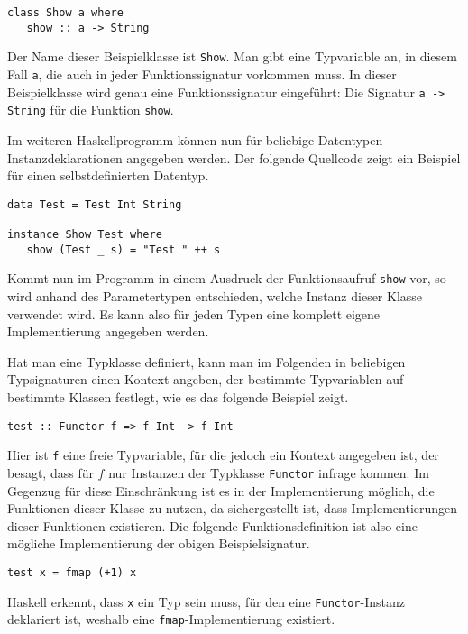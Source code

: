 \begin{verbatim}
class Show a where
   show :: a -> String
\end{verbatim}

Der Name dieser Beispielklasse ist \texttt{Show}. Man gibt eine Typvariable an, in diesem Fall \texttt{a}, die auch in jeder
Funktionssignatur vorkommen muss. In dieser Beispielklasse wird genau eine Funktionssignatur eingeführt: Die Signatur
\texttt{a -> String} für die Funktion \texttt{show}.

Im weiteren Haskellprogramm können nun für beliebige Datentypen Instanzdeklarationen angegeben werden. Der folgende
Quellcode zeigt ein Beispiel für einen selbstdefinierten Datentyp.

\begin{verbatim}
data Test = Test Int String

instance Show Test where
   show (Test _ s) = "Test " ++ s
\end{verbatim}

Kommt nun im Programm in einem Ausdruck der Funktionsaufruf \texttt{show} vor, so wird anhand des Parametertypen
entschieden, welche Instanz dieser Klasse verwendet wird. Es kann also für jeden Typen eine komplett eigene Implementierung
angegeben werden.

Hat man eine Typklasse definiert, kann man im Folgenden in beliebigen Typsignaturen einen Kontext angeben, der
bestimmte Typvariablen auf bestimmte Klassen festlegt, wie es das folgende Beispiel zeigt.

\begin{verbatim}
test :: Functor f => f Int -> f Int
\end{verbatim}

Hier ist \texttt{f} eine freie Typvariable, für die jedoch ein Kontext angegeben ist, der besagt, dass für $f$ nur Instanzen
der Typklasse \texttt{Functor} infrage kommen. Im Gegenzug für diese Einschränkung ist es in der Implementierung möglich,
die Funktionen dieser Klasse zu nutzen, da sichergestellt ist, dass Implementierungen dieser Funktionen
existieren. Die folgende Funktionsdefinition ist also eine mögliche Implementierung der obigen Beispielsignatur.

\begin{verbatim}
test x = fmap (+1) x
\end{verbatim}

Haskell erkennt, dass \texttt{x} ein Typ sein muss, für den eine \texttt{Functor}-Instanz deklariert ist, weshalb eine
\texttt{fmap}-Implementierung existiert.

